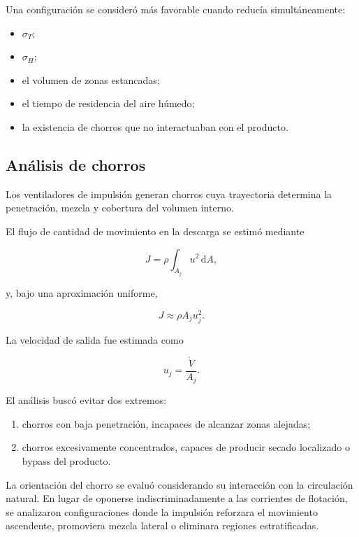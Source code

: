 Una configuración se consideró más favorable cuando reducía simultáneamente:

\begin{itemize}
    \item $\sigma_T$;
    \item $\sigma_H$;
    \item el volumen de zonas estancadas;
    \item el tiempo de residencia del aire húmedo;
    \item la existencia de chorros que no interactuaban con el producto.
\end{itemize}

\subsection{Análisis de chorros}
\label{subsec:analisis_jets}

Los ventiladores de impulsión generan chorros cuya trayectoria determina la penetración, mezcla y cobertura del volumen interno.

El flujo de cantidad de movimiento en la descarga se estimó mediante

\begin{equation}
J
=
\rho
\int_{A_j}
u^2\,\mathrm{d}A,
\label{eq:momento_jet}
\end{equation}

y, bajo una aproximación uniforme,

\begin{equation}
J
\approx
\rho A_j u_j^2.
\label{eq:momento_jet_uniforme}
\end{equation}

La velocidad de salida fue estimada como

\begin{equation}
u_j
=
\frac{\dot V}{A_j}.
\label{eq:velocidad_salida_jet}
\end{equation}

El análisis buscó evitar dos extremos:

\begin{enumerate}
    \item chorros con baja penetración, incapaces de alcanzar zonas alejadas;
    \item chorros excesivamente concentrados, capaces de producir secado localizado o bypass del producto.
\end{enumerate}

La orientación del chorro se evaluó considerando su interacción con la circulación natural. En lugar de oponerse indiscriminadamente a las corrientes de flotación, se analizaron configuraciones donde la impulsión reforzara el movimiento ascendente, promoviera mezcla lateral o eliminara regiones estratificadas.

